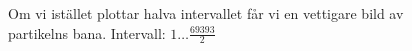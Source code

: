 \documentclass[a4paper]{article}
\begin{document}
\begin{figure}[H]
  \caption{Om vi istället plottar halva intervallet får vi en vettigare bild av partikelns bana. Intervall: $1\ldots\frac{69393}{2}$}
  \begin{centering}
    \setlength\fboxsep{0pt}
    \setlength\fboxrule{0.5pt}

\end{centering}
\end{figure}
\end{document}
